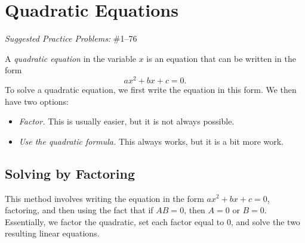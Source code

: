 \documentclass[letterpaper,12pt,oneside]{book}
\theoremstyle{definition}
\newtheorem{example}[theorem]{Example}
\newcommand{\practicesection}[2]{%
    \section{#1}
    \textit{Suggested Practice Problems:} #2
    \smallskip%
}
\begin{document}
%
%
%

\newpage

\practicesection{Quadratic Equations}{\#1--76}

\noindent
A \emph{quadratic equation} in the variable $x$ is an equation that can be written in the form 
\[
ax^2+bx+c=0.
\]
To solve a quadratic equation, we first write the equation in this form.  We then have two options:
\begin{itemize}
\item \emph{Factor.}  This is usually easier, but it is not always possible.
\item \emph{Use the quadratic formula.}  This always works, but it is a bit more work.
\end{itemize}

\subsection*{Solving by Factoring}

This method involves writing the equation in the form $ax^2+bx+c=0$, factoring, and then using the fact that if $AB=0$, then $A=0$ or $B=0$.  Essentially, we factor the quadratic, set each factor equal to $0$, and solve the two resulting linear equations.
\end{document}
